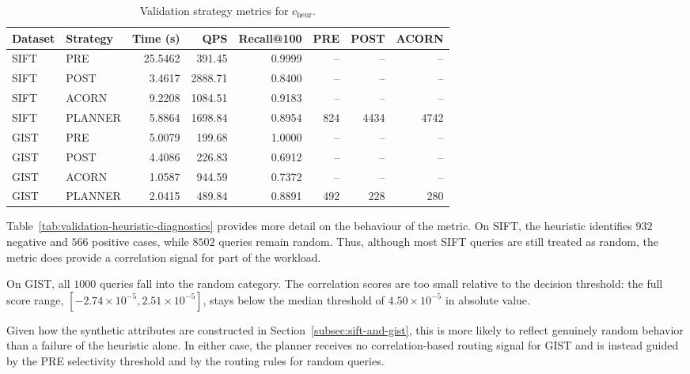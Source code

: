 \begin{table}[H]
    \centering
    \renewcommand{\arraystretch}{1.12}
    \begin{tabular}{llrrrrrr}
        \toprule
        Dataset & Strategy & Time (s) & QPS & Recall@100 & PRE & POST & ACORN \\
        \midrule
        SIFT & PRE     & 25.5462 & 391.45  & 0.9999 & --  & --   & --   \\
        SIFT & POST    & 3.4617  & 2888.71 & 0.8400 & --  & --   & --   \\
        SIFT & ACORN   & 9.2208  & 1084.51 & 0.9183 & --  & --   & --   \\
        SIFT & PLANNER & 5.8864  & 1698.84 & 0.8954 & 824 & 4434 & 4742 \\
        \midrule
        GIST & PRE     & 5.0079  & 199.68  & 1.0000 & --  & --   & --   \\
        GIST & POST    & 4.4086  & 226.83  & 0.6912 & --  & --   & --   \\
        GIST & ACORN   & 1.0587  & 944.59  & 0.7372 & --  & --   & --   \\
        GIST & PLANNER & 2.0415  & 489.84  & 0.8891 & 492 & 228  & 280  \\
        \bottomrule
    \end{tabular}
    \caption{Validation strategy metrics for \(c_{\mathrm{heur}}\).}
    \label{tab:validation-heuristic}
\end{table}

Table~\ref{tab:validation-heuristic-diagnostics} provides more detail on the behaviour of the metric.
On SIFT, the heuristic identifies \(932\) negative and \(566\) positive cases, while \(8502\) queries remain random.
Thus, although most SIFT queries are still treated as random, the metric does provide a correlation signal for part of the workload.

On GIST, all \(1000\) queries fall into the random category.
The correlation scores are too small relative to the decision threshold: the full score range,
\([-2.74 \times 10^{-5}, 2.51 \times 10^{-5}]\), stays below the median threshold of
\(4.50 \times 10^{-5}\) in absolute value.

Given how the synthetic attributes are constructed in Section~\ref{subsec:sift-and-gist}, this is more likely to reflect genuinely random behavior than a failure of the heuristic alone.
In either case, the planner receives no correlation-based routing signal for GIST and is instead guided by the PRE selectivity threshold and by the routing rules for random queries.

